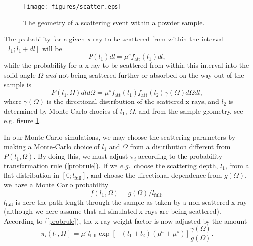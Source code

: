 \begin{figure}
  \begin{center}
    \texttt{[image: figures/scatter.eps]}
  \end{center}
\caption{The geometry of a scattering event within a powder sample.}
\label{powderFig}
\end{figure}

The probability for a given x-ray to be scattered from within the interval
$[ l_1 ; l_1+dl ]$ will be
\begin{equation}
P(l_1) dl = \mu^s f_\mathrm{att}(l_1) dl ,
\end{equation}
while the probability for a x-ray to be scattered from within
this interval into the solid angle $\Omega$ {\em and}
not being scattered further
or absorbed on the way out of the sample is
\begin{equation}
P(l_1,\Omega) dl d\Omega =
  \mu^s f_\mathrm{att}(l_1) f_\mathrm{att}(l_2) \gamma(\Omega) d\Omega dl ,
\end{equation}
where $\gamma(\Omega)$ is the directional distribution
of the scattered x-rays, and $l_2$ is determined by
Monte Carlo chocies of $l_1$, $\Omega$,
and from the sample geometry, see e.g. figure \ref{powderFig}.

In our Monte-Carlo simulations, we may choose the scattering
parameters by making a Monte-Carlo choice of $l_1$ and $\Omega$
from a distribution different from $P(l_1,\Omega)$.
By doing this, we must adjust $\pi_i$ according to
the probability transformation rule (\ref{probrule}).
If we {\em e.g.}\ choose the scattering depth, $l_1$,
from a flat distribution in $[ 0 ; l_\mathrm{full} ]$,
and choose the directional dependence from $g(\Omega)$,
we have a Monte Carlo probability
\begin{equation}
f(l_1,\Omega) = g(\Omega) / l_\mathrm{full} ,
\end{equation}
$l_\mathrm{full}$ is here the path length through the sample
as taken by a non-scattered x-ray (although we here
assume that all simulated x-rays are being scattered).
According to (\ref{probrule}), the x-ray weight factor
is now adjusted by the amount
\begin{equation}     \label{sampleprob}
\pi_i(l_1,\Omega) =
 \mu^s l_\mathrm{full} \exp \left[ - (l_1+l_2) (\mu^a + \mu^s) \right]
  \frac{\gamma(\Omega)}{g(\Omega)} .
\end{equation}

